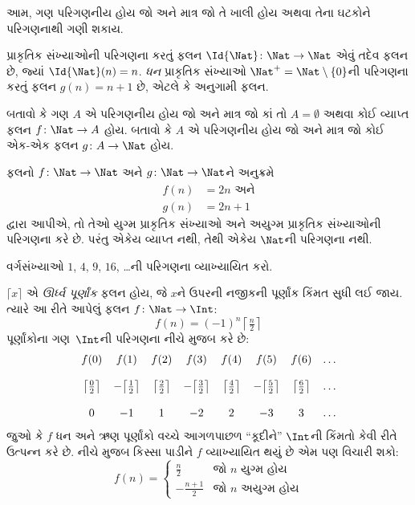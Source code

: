 \begin{explain}
આમ, ગણ પરિગણનીય હોય જો અને માત્ર જો તે ખાલી હોય અથવા તેના
ઘટકોને પરિગણનાથી ગણી શકાય.
\end{explain}

\begin{ex}
પ્રાકૃતિક સંખ્યાઓની પરિગણના કરતું ફલન
$\Id{\Nat} \colon \Nat \to \Nat$ એવું તદેવ ફલન છે, જ્યાં
$\Id{\Nat}(n) = n$. \emph{ધન} પ્રાકૃતિક સંખ્યાઓ
$\Nat^+ = \Nat \setminus \{0\}$ની પરિગણના કરતું ફલન
$g(n) = n + 1$ છે, એટલે કે અનુગામી ફલન.
\end{ex}

\begin{prob}
બતાવો કે ગણ $A$ એ પરિગણનીય હોય જો અને માત્ર જો કાં તો
$A = \emptyset$ અથવા કોઈ વ્યાપ્ત ફલન $f\colon \Nat \to A$ હોય.
બતાવો કે $A$ એ પરિગણનીય હોય જો અને માત્ર જો કોઈ
એક-એક ફલન $g\colon A \to \Nat$ હોય.
\end{prob}

\begin{ex}
ફલનો $f\colon \Nat \to \Nat$ અને $g \colon \Nat \to \Nat$ને
અનુક્રમે
\begin{align*}
  f(n) & = 2n \text{ અને}\\
  g(n) & = 2n+1
\end{align*}
દ્વારા આપીએ, તો તેઓ યુગ્મ પ્રાકૃતિક સંખ્યાઓ અને અયુગ્મ પ્રાકૃતિક
સંખ્યાઓની પરિગણના કરે છે. પરંતુ એકેય વ્યાપ્ત નથી, તેથી
એકેય $\Nat$ની પરિગણના નથી.
\end{ex}

\begin{prob}
વર્ગસંખ્યાઓ $1$, $4$, $9$, $16$, \dots{}ની પરિગણના વ્યાખ્યાયિત કરો.
\end{prob}

\begin{ex}
$\lceil x \rceil$ એ \emph{ઊર્ધ્વ પૂર્ણાંક} ફલન હોય, જે $x$ને
ઉપરની નજીકની પૂર્ણાંક કિંમત સુધી લઈ જાય. ત્યારે આ રીતે આપેલું
ફલન $f \colon \Nat \to \Int$:
\[
  f(n) = (-1)^{n} \left\lceil\tfrac{n}{2}\right\rceil
\]
પૂર્ણાંકોના ગણ~$\Int$ની પરિગણના નીચે મુજબ કરે છે:
\[
\begin{array}{c c c c c c c c}
f(0) & f(1) & f(2) & f(3) & f(4) & f(5) & f(6) & \dots \\ \\
\big\lceil \tfrac{0}{2} \big\rceil & -\big\lceil \tfrac{1}{2}\big\rceil &  \big\lceil \tfrac{2}{2} \big\rceil & -\big\lceil \tfrac{3}{2} \big\rceil & \big\lceil \tfrac{4}{2} \big\rceil  & -\big\lceil \tfrac{5}{2}\big\rceil & \big\lceil \tfrac{6}{2} \big\rceil & \dots \\ \\
0 & -1 & 1 & -2 & 2 & -3 & 3& \dots
\end{array}
\]
જુઓ કે $f$ ધન અને ઋણ પૂર્ણાંકો વચ્ચે આગળપાછળ “કૂદીને” $\Int$ની
કિંમતો કેવી રીતે ઉત્પન્ન કરે છે. નીચે મુજબ કિસ્સા પાડીને $f$
વ્યાખ્યાયિત થયું છે એમ પણ વિચારી શકો:
\[
f(n) = \begin{cases}
  \frac{n}{2} & \text{જો $n$ યુગ્મ હોય}\\
  -\frac{n+1}{2} & \text{જો $n$ અયુગ્મ હોય}
  \end{cases}
\]
\end{ex}

